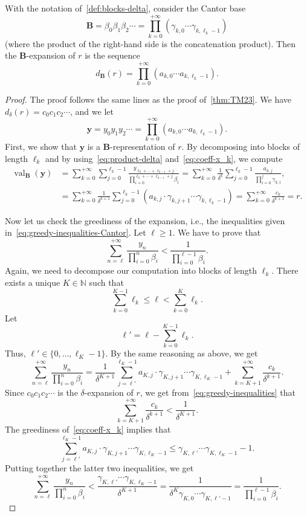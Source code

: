 \documentclass[12pt,reqno]{amsart}
\newcommand{\B}{{\mathbf{B}}}
\DeclareMathOperator{\val}{val}
\begin{document}
\begin{theorem}
\label{thm:blocks-delta}
With the notation of~\cref{def:blocks-delta}, consider the Cantor base 
\[
    \B=\beta_0\beta_1\beta_2\cdots=\prod_{k=0}^{+\infty} (\gamma_{k,0}\cdots \gamma_{k,\ell_k-1})
\]
(where the product of the right-hand side is the concatenation product). Then the $\B$-expansion of $r$ is the sequence 
\[
    d_{\B}(r)=\prod_{k=0}^{+\infty} (a_{k,0}\cdots a_{k,\ell_k-1}).
\]
\end{theorem}

\begin{proof}
The proof follows the same lines as the proof of~\cref{thm:TM23}. We have $d_\delta(r)=c_0c_1c_2\cdots$, and we let 
\[
    \mathbf{y}=y_0y_1y_2\cdots
   =\prod_{k=0}^{+\infty} (a_{k,0}\cdots a_{k,\ell_k-1}).
\]
First, we show that $\mathbf{y}$ is a $\B$-representation of $r$. By decomposing into blocks of length $\ell_k$ and by using~\eqref{eq:product-delta} and~\eqref{eq:coeff-x_k}, we compute
\begin{align*}
    \val_{\B}(\mathbf{y})
    &=\sum_{k=0}^{+\infty} \sum_{j=0}^{\ell_k-1}\frac{y_{\ell_0+\cdots+\ell_{k-1}+j}}{\prod_{i=0}^{\ell_0+\cdots+\ell_{k-1}+j}\beta_i}
    =\sum_{k=0}^{+\infty} \frac{1}{\delta^k}\sum_{j=0}^{\ell_k-1}\frac{a_{k,j}}{\prod_{i=0}^j\gamma_{k,i}},\\
    &=\sum_{k=0}^{+\infty} \frac{1}{\delta^{k+1}}\sum_{j=0}^{\ell_k-1}(a_{k,j}\cdot \gamma_{k,j+1} \cdots \gamma_{k,\ell_k-1})
    =\sum_{k=0}^{+\infty}\frac{c_k}{\delta^{k+1}}=r.
\end{align*}

Now let us check the greediness of the expansion, i.e., the inequalities given in~\eqref{eq:greedy-inequalities-Cantor}. Let $\ell\ge 1$. We have to prove that 
\[
    \sum_{n= \ell}^{+\infty} \frac{y_{n}}{\prod_{i=0}^n\beta_i}
    <\frac{1}{\prod_{i=0}^{\ell -1}\beta_i}.
\]
Again, we need to decompose our computation into blocks of length $\ell_k$. There exists a unique $K\in\mathbb{N}$ such that 
\[
    \sum_{k=0}^{K-1}\ell_k\le \ell< \sum_{k=0}^K\ell_k.
\]
Let 
\[
    \ell'=\ell-\sum_{k=0}^{K-1}\ell_k.
\]
Thus, $\ell'\in\{0,\ldots,\ell_K-1\}$. By the same reasoning as above, we get
\begin{equation*}
  \label{eq:part1}
  \sum_{n=\ell}^{+\infty} \frac{y_n}{\prod_{i=0}^n\beta_i}
  =\frac{1}{\delta^{K+1}} \sum_{j=\ell'}^{\ell_K-1} a_{K,j}\cdot \gamma_{K,j+1}\cdots\gamma_{K,\ell_{K}-1}
  +\sum_{k=K+1}^{+\infty}\frac{c_k}{\delta^{k+1}}.
\end{equation*}
Since $c_0c_1c_2\cdots$ is the $\delta$-expansion of $r$, we get from~\eqref{eq:greedy-inequalities} that 
\[
    \sum_{k=K+1}^{+\infty}\frac{c_k}{\delta^{k+1}}<\frac{1}{\delta^{K+1}}.
\]
The greediness of~\eqref{eq:coeff-x_k} implies that
\[
    \sum_{j=\ell'}^{\ell_K-1} a_{K,j}\cdot \gamma_{K,j+1}\cdots\gamma_{K,\ell_K-1}
    \le \gamma_{K,\ell'}\cdots\gamma_{K,\ell_K-1}-1.
\]  
Putting together the latter two inequalities, we get
\[
     \sum_{n= \ell}^{+\infty} \frac{y_{n}}{\prod_{i=0}^n\beta_i}
     <\frac{\gamma_{K,\ell'}\cdots\gamma_{K,\ell_{K}-1}}{\delta^{K+1}}
     =\frac{1}{\delta^K\gamma_{K,0}\cdots\gamma_{K,\ell'-1}}
     =\frac{1}{\prod_{i=0}^{\ell-1}\beta_i}.
\]
\end{proof}
\end{document}
